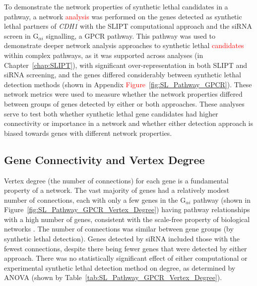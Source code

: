 
To demonstrate the network properties of \gls{synthetic lethal} candidates in a pathway, a network \textcolor{red}{analysis} was performed on the genes detected as \gls{synthetic lethal} partners of \textit{CDH1} with the \gls{SLIPT} computational approach and the \gls{siRNA} screen \citep{Telford2015} %
in %
G$_{\alpha i}$ signalling, a \gls{GPCR} \gls{pathway}. This \gls{pathway} was used to demonstrate deeper network analysis approaches to \gls{synthetic lethal} \textcolor{red}{candidates} within complex \glspl{pathway}, as it was supported across analyses (in Chapter~\ref{chap:SLIPT}), with significant over-representation in both \gls{SLIPT} and \gls{siRNA} screening, and the genes differed considerably between \gls{synthetic lethal} detection methods (shown in Appendix \textcolor{red}{Figure}~\ref{fig:SL_Pathway_GPCR}).  These network metrics were used to measure whether the network properties differed between groups of genes detected by either or both approaches. These analyses serve to test both whether \gls{synthetic lethal} gene candidates had higher connectivity or importance in a network and whether either detection approach is biased towards genes with different network properties.  


\FloatBarrier


\subsection{Gene Connectivity and Vertex Degree}  \label{chapt4:Network_Vertex_Degree}

Vertex degree (the number of connections) for each gene is a fundamental property of a network. The vast majority of genes had a relatively modest number of connections, each with only a few genes in the G$_{\alpha i}$ \gls{pathway} (shown in Figure~\ref{fig:SL_Pathway_GPCR_Vertex_Degree}) having \gls{pathway} relationships with a high number of genes, consistent with the \gls{scale-free} property of biological networks \citep{Barabasi2004}. The number of connections was similar between gene groups (by \gls{synthetic lethal} detection). Genes detected by \gls{siRNA} included those with the fewest connections, despite there being fewer genes that were detected by either approach. 
There was no statistically significant effect of either computational or experimental \gls{synthetic lethal} detection method on  degree, as determined by \gls{ANOVA} (shown by Table~\ref{tab:SL_Pathway_GPCR_Vertex_Degree}).

